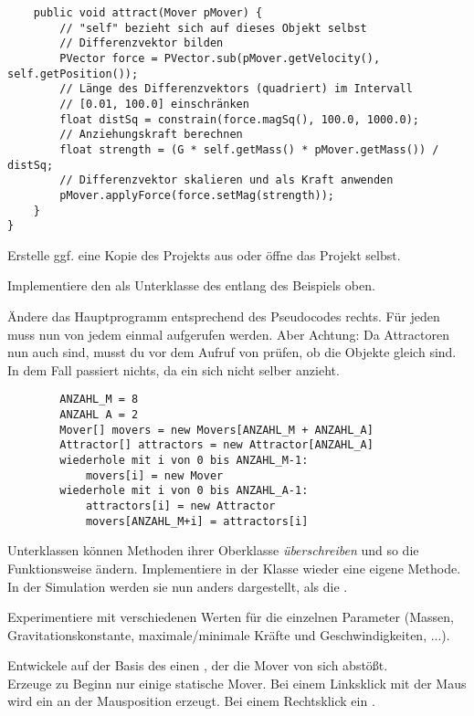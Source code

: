 \documentclass[9pt, a4paper, ngerman]{arbeitsblatt}
\begin{document}
\begin{aufgabe}[subtitle=Vererbungsbeziehungen,icon=\iconComputer]
\begin{verbatim}
	public void attract(Mover pMover) {
		// "self" bezieht sich auf dieses Objekt selbst
		// Differenzvektor bilden
		PVector force = PVector.sub(pMover.getVelocity(), self.getPosition());
		// Länge des Differenzvektors (quadriert) im Intervall
		// [0.01, 100.0] einschränken
		float distSq = constrain(force.magSq(), 100.0, 1000.0);
		// Anziehungskraft berechnen
		float strength = (G * self.getMass() * pMover.getMass()) / distSq;
		// Differenzvektor skalieren und als Kraft anwenden
		pMover.applyForce(force.setMag(strength));
	}
}
\end{verbatim}
\begin{enuma}
	\item Erstelle ggf. eine Kopie des Projekts aus  oder öffne das Projekt selbst.
	\item Implementiere den  als Unterklasse des  entlang des Beispiels oben.
\end{enuma}
\begin{links}[.49]
	\begin{enuma}[resume]
		\item Ändere das Hauptprogramm entsprechend des Pseudocodes rechts.
		Für jeden  muss nun  von jedem  einmal aufgerufen werden. Aber Achtung: Da Attractoren nun auch  sind, musst du vor dem Aufruf von  prüfen, ob die Objekte gleich sind. In dem Fall passiert nichts, da ein  sich nicht selber anzieht.
	\end{enuma}
\end{links}\begin{rechts}[.49]
	\begin{verbatim}
		ANZAHL_M = 8
		ANZAHL A = 2
		Mover[] movers = new Movers[ANZAHL_M + ANZAHL_A]
		Attractor[] attractors = new Attractor[ANZAHL_A]
		wiederhole mit i von 0 bis ANZAHL_M-1:
			movers[i] = new Mover
		wiederhole mit i von 0 bis ANZAHL_A-1:
			attractors[i] = new Attractor
			movers[ANZAHL_M+i] = attractors[i]
		\end{verbatim}
\end{rechts}
\begin{enuma}[start=4]
	\item Unterklassen können Methoden ihrer Oberklasse \emph{überschreiben} und so die Funktionsweise ändern. Implementiere in der Klasse  wieder eine eigene  Methode. In der Simulation werden sie nun anders dargestellt, als die .
	\item Experimentiere mit verschiedenen Werten für die einzelnen Parameter (Massen, Gravitationskonstante, maximale/minimale Kräfte und Geschwindigkeiten, ...).
	\item Entwickele auf der Basis des  einen , der die Mover von sich abstößt. \\
	Erzeuge zu Beginn nur einige statische Mover. Bei einem Linksklick mit der Maus wird ein  an der Mausposition erzeugt. Bei einem Rechtsklick ein .
\end{enuma}
\end{aufgabe}
\end{document}
